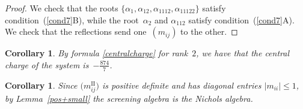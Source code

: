 \documentclass[pdftex]{sigma}%
\numberwithin{equation}{section}
\newtheorem{cor}[teo]{Corollary}
\begin{document}
\begin{proof}
We check that the roots $\lbrace \alpha_1, \alpha_{12}, \alpha_{1112}, \alpha_{11122}\rbrace$ satisfy condition~(\ref{cond7}B), while the root~$\alpha_2$ and $\alpha_{112}$ satisfy condition~(\ref{cond7}A).
We check that the reflections send one~$(m_{ij})$ to the other.
\end{proof}
\begin{cor}
By formula \eqref{centralcharge} for rank~$2$, we have that the central charge of the system is~$-\frac{874}{7}$.
\end{cor}

\begin{cor}Since $\big(m_{ij}^{\mathrm{II}}\big)$ is positive definite and has diagonal entries $|m_{ii}|\leq 1$, by Lem\-ma~{\rm \ref{pos+small}} the screening algebra is the Nichols algebra.
\end{cor}
\end{document}
